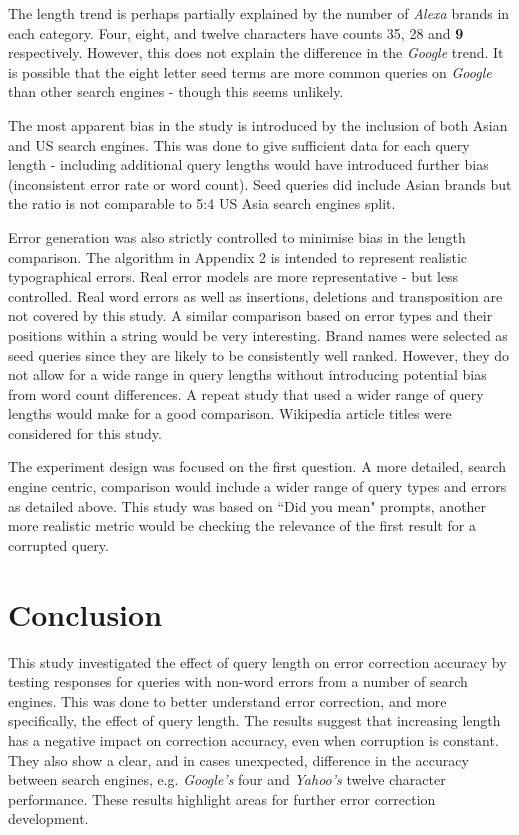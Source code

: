 \documentclass{csfourzero}
\begin{document}
The length trend is perhaps partially explained by the number of \textit{Alexa} brands in each category. Four, eight, and twelve characters have counts 35, 28 and \textbf{9} respectively. However, this does not explain the difference in the \textit{Google} trend. It is possible that the eight letter seed terms are more common queries on \textit{Google} than other search engines - though this seems unlikely.

The most apparent bias in the study is introduced by the inclusion of both Asian and US search engines. This was done to give sufficient data for each query length - including additional query lengths would have introduced further bias (inconsistent error rate or word count). Seed queries did include Asian brands but the ratio is not comparable to 5:4 US Asia search engines split.

Error generation was also strictly controlled to minimise bias in the length comparison. The algorithm in Appendix 2 is intended to represent realistic typographical errors. Real error models are more representative - but less controlled. Real word errors as well as insertions, deletions and transposition are not covered by this study. A similar comparison based on error types and their positions within a string would be very interesting. Brand names were selected as seed queries since they are likely to be consistently well ranked. However, they do not allow for a wide range in query lengths without introducing potential bias from word count differences. A repeat study that used a wider range of query lengths would make for a good comparison. Wikipedia article titles were considered for this study.

The experiment design was focused on the first question. A more detailed, search engine centric, comparison would include a wider range of query types and errors as detailed above. This study was based on ``Did you mean" prompts, another more realistic metric would be checking the relevance of the first result for a corrupted query.

\section{Conclusion}
\label{sec:conc}

This study investigated the effect of query length on error correction accuracy by testing responses for queries with non-word errors from a number of search engines. This was done to better understand error correction, and more specifically, the effect of query length. The results suggest that increasing length has a negative impact on correction accuracy, even when corruption is constant. They also show a clear, and in cases unexpected, difference in the accuracy between search engines, e.g. \textit{Google's} four and \textit{Yahoo's} twelve character performance. These results highlight areas for further error correction development.
\end{document}
